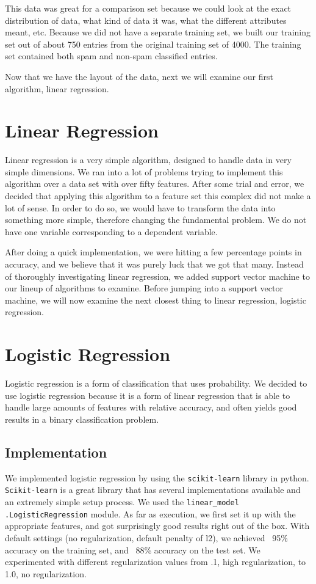 \documentclass{article} %
\begin{document}
This data was great for a comparison set because we could look at the exact distribution
of data, what kind of data it was, what the different attributes meant, etc. Because we
did not have a separate training set, we built our training set out of about 750 entries
from the original training set of 4000. The training set contained both spam and non-spam
classified entries.

Now that we have the layout of the data, next we will examine our first algorithm,
linear regression.

\section{Linear Regression}
Linear regression is a very simple algorithm, designed to handle data in very simple
dimensions. We ran into a lot of problems trying to implement this algorithm over
a data set with over fifty features. After some trial and error, we decided that
applying this algorithm to a feature set this complex did not make a lot of sense.
In order to do so, we would have to transform the data into something more simple,
therefore changing the fundamental problem. We do not have one variable corresponding
to a dependent variable.

After doing a quick implementation, we were hitting a few percentage points in accuracy,
and we believe that it was purely luck that we got that many. Instead of thoroughly
investigating linear regression, we added support vector machine to our lineup of
algorithms to examine. Before jumping into a support vector machine, we will now
examine the next closest thing to linear regression, logistic regression.

\section{Logistic Regression}
Logistic regression is a form of classification that uses probability. We decided
to use logistic regression because it is a form of linear regression that is able
to handle large amounts of features with relative accuracy, and often yields good
results in a binary classification problem.
	\subsection{Implementation}
	We implemented logistic regression by using the \texttt{scikit-learn} library
	in python. \texttt{Scikit-learn} is a great library that has several implementations
	available and an extremely simple setup process. We used the \texttt{linear\_model}
	\texttt{.LogisticRegression} module. As far as execution, we first set it up with
	the appropriate features, and got surprisingly good results right out of the box.
	With default settings (no regularization, default penalty of l2), we achieved
	~95\% accuracy on the training set, and ~88\% accuracy on the test set. We
	experimented with different regularization values from .1, high regularization,
	to 1.0, no regularization.
\end{document}
